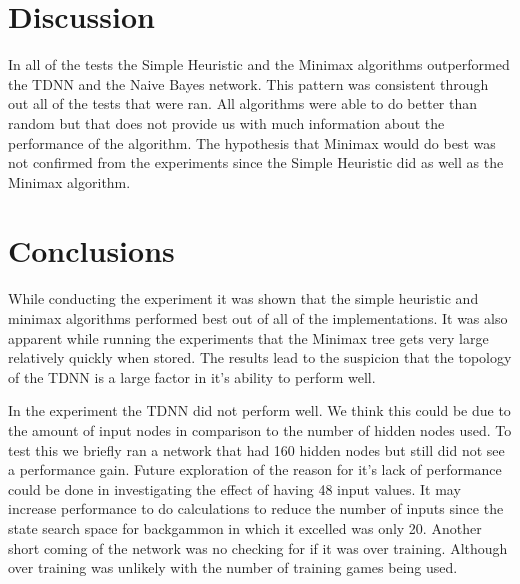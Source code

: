 \documentclass[12pt,letterpaper]{article}
\begin{document}
\clearpage

\section{Discussion}
In all of the tests the Simple Heuristic and the Minimax algorithms outperformed the TDNN and the Naive Bayes network. This pattern was consistent through out all of the tests that were ran. All algorithms were able to do better than random but that does not provide us with much information about the performance of the algorithm. The hypothesis that Minimax would do best was not confirmed from the experiments since the Simple Heuristic did as well as the Minimax algorithm. 

\section{Conclusions}
While conducting the experiment it was shown that the simple heuristic and minimax algorithms performed best out of all of the implementations. It was also apparent while running the experiments that the Minimax tree gets very large relatively quickly when stored. The results lead to the suspicion that the topology of the TDNN is a large factor in it's ability to perform well.

In the experiment the TDNN did not perform well. We think this could be due to the amount of input nodes in comparison to the number of hidden nodes used. To test this we briefly ran a network that had 160 hidden nodes but still did not see a performance gain. Future exploration of the reason for it's lack of performance could be done in investigating the effect of having 48 input values. It may increase performance to do calculations to reduce the number of inputs since the state search space for backgammon in which it excelled was only 20. Another short coming of the network was no checking for if it was over training. Although over training was unlikely with the number of training games being used.



\newpage



\nocite{*}
\end{document}
